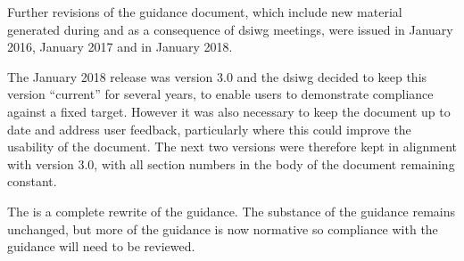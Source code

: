 Further revisions of the guidance document, which include new material generated during and as a consequence of \gls{dsiwg} meetings, were issued in January 2016, January 2017 and in January 2018.

The January 2018 release was version 3.0 and the \gls{dsiwg} decided to keep this version ``current'' for several years, to enable users to demonstrate compliance against a fixed target. However it was also necessary to keep the document up to date and address user feedback, particularly where this could improve the usability of the document. The next two versions were therefore kept in alignment with version 3.0, with all section numbers in the body of the document remaining constant.

The \docmodmonthlong \docmodyear is a complete rewrite of the guidance. The substance of the guidance remains unchanged, but more of the guidance is now normative so compliance with the guidance will need to be reviewed.

